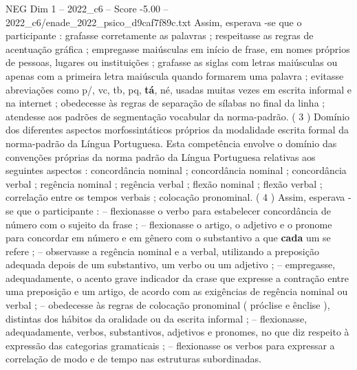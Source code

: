 \begin{textsample}{NEG Dim 1 – 2022\_c6 – Score -5.00 – 2022\_c6/enade\_2022\_psico\_d9caf7f89c.txt}
Assim, esperava -se que o participante : grafasse corretamente as palavras ; respeitasse as regras de acentuação gráfica ; empregasse maiúsculas em início de frase, em nomes próprios de pessoas, lugares ou instituições ; grafasse as siglas com letras maiúsculas ou apenas com a primeira letra maiúscula quando formarem uma palavra ; evitasse abreviações como p/, vc, tb, pq, \textbf{tá}, né, usadas muitas vezes em escrita informal e na internet ; obedecesse às regras de separação de sílabas no final da linha ; atendesse aos padrões de segmentação vocabular da norma-padrão. ( 3 ) Domínio dos diferentes aspectos morfossintáticos próprios da modalidade escrita formal da norma-padrão da Língua Portuguesa.
Esta competência envolve o domínio das convenções próprias da norma padrão da Língua Portuguesa relativas aos seguintes aspectos : concordância nominal ; concordância nominal ; concordância verbal ; regência nominal ; regência verbal ; flexão nominal ; flexão verbal ; correlação entre os tempos verbais ; colocação pronominal. ( 4 ) Assim, esperava -se que o participante : – flexionasse o verbo para estabelecer concordância de número com o sujeito da frase ; – flexionasse o artigo, o adjetivo e o pronome para concordar em número e em gênero com o substantivo a que \textbf{cada} um se refere ; – observasse a regência nominal e a verbal, utilizando a preposição adequada depois de um substantivo, um verbo ou um adjetivo ; – empregasse, adequadamente, o acento grave indicador da crase que expresse a contração entre uma preposição e um artigo, de acordo com as exigências de regência nominal ou verbal ; – obedecesse às regras de colocação pronominal ( próclise e ênclise ), distintas dos hábitos da oralidade ou da escrita informal ; – flexionasse, adequadamente, verbos, substantivos, adjetivos e pronomes, no que diz respeito à expressão das categorias gramaticais ; – flexionasse os verbos para expressar a correlação de modo e de tempo nas estruturas subordinadas.

\end{textsample}
